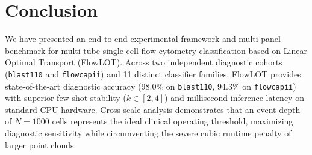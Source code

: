 \documentclass[10pt,journal,compsoc]{IEEEtran}
\begin{document}
\section{Conclusion}
We have presented an end-to-end experimental framework and multi-panel benchmark for multi-tube single-cell flow cytometry classification based on Linear Optimal Transport (FlowLOT). Across two independent diagnostic cohorts (\texttt{blast110} and \texttt{flowcapii}) and 11 distinct classifier families, FlowLOT provides state-of-the-art diagnostic accuracy ($98.0\%$ on \texttt{blast110}, $94.3\%$ on \texttt{flowcapii}) with superior few-shot stability ($k \in [2, 4]$) and millisecond inference latency on standard CPU hardware. Cross-scale analysis demonstrates that an event depth of $N=1000$ cells represents the ideal clinical operating threshold, maximizing diagnostic sensitivity while circumventing the severe cubic runtime penalty of larger point clouds.
\end{document}

